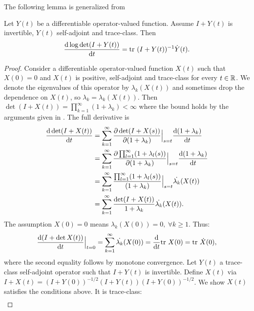 \documentclass{amsart}
\numberwithin{equation}{section}
\begin{document}
The following lemma is generalized from \cite[Chapter 9,
  Theorem 4, pp. 127]{Lax97}
\begin{lemma}\label{lemma:lax}
  Let $Y(t)$ be a differentiable operator-valued function. Assume 
  $I+Y(t)$ is invertible, $Y(t)$ self-adjoint and trace-class. Then
  \begin{equation*}
    \frac{\text{\textup{d}} \log \det (I+Y(t))}{\text{\textup{d}} t} = \textup{tr}\  (I+Y(t))^{-1} \dot{Y}(t).
  \end{equation*}
\end{lemma}
\begin{proof}
  Consider a differentiable operator-valued function $X(t)$ such that
  $X(0) = 0$ and $X(t)$ is positive, self-adjoint and trace-class for
  every $t\in \mathbb{R}$. We denote the eigenvalues of this operator by
  $\lambda_k(X(t))$ and sometimes drop the dependence on $X(t)$, so
  $\lambda_k = \lambda_k(X(t))$.  Then $\det (I+X(t)) =
  \prod_{k=1}^{\infty} (1+\lambda_k) < \infty$ where the bound holds
  by the arguments given in \cite{AlexanderianGloorGhattas14}. The
  full derivative is
  \begin{align*}
    \frac{\text{\textup{d}} \det (I+X(t))}{\text{\textup{d}} t} 
    &= \sum_{k=1}^{\infty} 
    \frac{\partial \det (I+X(s))}{\partial (1+\lambda_k)}\Big |_{s=t}
    \frac{\text{\textup{d}} (1+\lambda_k)}{\text{\textup{d}} t} \\
    &= \sum_{k=1}^{\infty} \frac{\partial \prod_{l=1}^{\infty}
      (1+\lambda_l(s))}{\partial (1+\lambda_k)}\Big |_{s=t}
    \frac{\text{\textup{d}} (1+\lambda_k)}{\text{\textup{d}} t} \\
    &= \sum_{k=1}^{\infty} \frac{\prod_{l=1}^{\infty}
      (1+\lambda_l(s))}{(1+\lambda_k)}\Big |_{s=t}
    \dot{\lambda_k}(X(t)) \\
    &= \sum_{k=1}^{\infty} \frac{\det (I+X(t))}{1 +\lambda_k} \dot{\lambda_k}(X(t)).
  \end{align*}
  The assumption $X(0) = 0$ means $\lambda_k(X(0)) = 0,\ \forall k \geq 1$. Thus:
  \begin{align*}
    \frac{\text{\textup{d}} (I+\det X(t))}{\text{\textup{d}} t}\Big |_{t=0} 
    = \sum_{k=1}^{\infty} \dot{\lambda_k}(X(0)) 
    = \frac{\text{\textup{d}} }{\text{\textup{d}} t}\textup{tr}\  X(0)
    = \textup{tr}\  \dot{X}(0),
  \end{align*}
  where the second equality follows by monotone convergence. 
  Let $Y(t)$ a trace-class self-adjoint operator such that 
  $I+Y(t)$ is invertible.
  Define $X(t)$ via $I+X(t) = (I+Y(0))^{-1/2} (I+Y(t)) (I+Y(0))^{-1/2}$. 
  We show $X(t)$ satisfies the conditions above. It is trace-class:
  \begin{align*}

\end{align*}
\end{proof}
\end{document}
